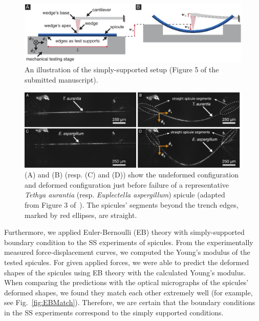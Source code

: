 \documentclass[11pt,letterpaper]{report}
\begin{document}
\begin{enumerate}[label=\textit{1.\arabic*},wide, labelwidth=!, labelindent=0pt]
\begin{figure}[H]
\centering
\includegraphics[width = 1.0\textwidth]{Figures/SSsetup_V4.pdf}
\caption{An illustration of the simply-supported setup (Figure 5 of the submitted manuscript).}
\label{fig:SSsetup}
\end{figure}
\begin{figure}[H]
\centering
\includegraphics[width = 1.0\textwidth]{Figures/Straight.pdf}
\caption{(A) and (B) (resp. (C) and (D)) show the undeformed configuration and deformed configuration just before failure of a representative \textit{Tethya aurantia} (resp. \textit{Euplectella aspergillum}) spicule (adapted from Figure 3 of~\cite{monn2017enhanced}). The spicules' segments beyond the trench edges, marked by red ellipses, are straight.}
\label{fig:photos}
\end{figure}


Furthermore, we applied Euler-Bernoulli (EB) theory with simply-supported boundary condition to the SS experiments of spicules. From the experimentally measured force-displacement curves, we computed the Young's modulus of the tested spicules. For given applied forces, we were able to predict the deformed shapes of the spicules using EB theory with the calculated Young's modulus. When comparing the predictions with the optical micrographs of the spicules' deformed shapes, we found they match each other extremely well (for example, see Fig.~\ref{fig:EBMatch}). Therefore, we are certain that the boundary conditions in the SS experiments correspond to the simply supported conditions.


\end{enumerate}
\end{document}
